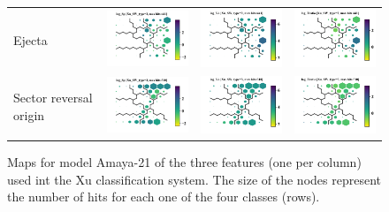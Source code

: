 \documentclass[utf8]{frontiersSCNS} %
\begin{document}
\begin{figure}[h!]
\begin{tabular}{m{2.5cm}CCC}
		Ejecta & \includegraphics[width=4.5cm]{Amaya/SWtype-Xu_SW_type-2-log_Sp} &
		\includegraphics[width=4.5cm]{Amaya/SWtype-Xu_SW_type-2-log_Va} &
		\includegraphics[width=4.5cm]{Amaya/SWtype-Xu_SW_type-2-log_Tratio} \hfill	\\
		
		Sector reversal origin & \includegraphics[width=4.5cm]{Amaya/SWtype-Xu_SW_type-3-log_Sp} &
		\includegraphics[width=4.5cm]{Amaya/SWtype-Xu_SW_type-3-log_Va} &
		\includegraphics[width=4.5cm]{Amaya/SWtype-Xu_SW_type-3-log_Tratio} \hfill	\\
	\end{tabular}
	\caption{Maps for model Amaya-21 of the three features (one per column) used int the Xu classification system. The size of the nodes represent the number of hits for each one of the four classes (rows).}\label{fig:SWtXu}
\end{figure}
\end{document}
